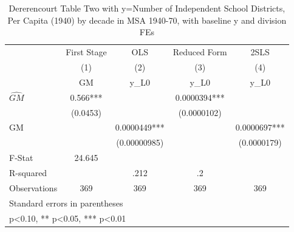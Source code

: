 \begin{table}[htbp]\centering
\def\sym#1{\ifmmode^{#1}\else\(^{#1}\)\fi}
\caption{Dererencourt Table Two with y=Number of Independent School Districts, Per Capita (1940) by decade in MSA 1940-70, with baseline y and division FEs}
\begin{tabular}{l*{4}{c}}
\toprule
                    & First Stage   &         OLS   &Reduced Form   &        2SLS   \\
                    &\multicolumn{1}{c}{(1)}&\multicolumn{1}{c}{(2)}&\multicolumn{1}{c}{(3)}&\multicolumn{1}{c}{(4)}\\
                    &\multicolumn{1}{c}{GM}&\multicolumn{1}{c}{y\_L0}&\multicolumn{1}{c}{y\_L0}&\multicolumn{1}{c}{y\_L0}\\
\midrule
$\hat{GM}$          &       0.566***&               &   0.0000394***&               \\
                    &    (0.0453)   &               & (0.0000102)   &               \\
\addlinespace
GM                  &               &   0.0000449***&               &   0.0000697***\\
                    &               &(0.00000985)   &               & (0.0000179)   \\
\midrule
F-Stat              &      24.645   &               &               &               \\
R-squared           &               &        .212   &          .2   &               \\
Observations        &         369   &         369   &         369   &         369   \\
\bottomrule
\multicolumn{5}{l}{\footnotesize Standard errors in parentheses}\\
\multicolumn{5}{l}{\footnotesize * p<0.10, ** p<0.05, *** p<0.01}\\
\end{tabular}
\end{table}
